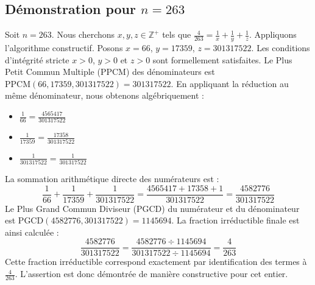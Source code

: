 \documentclass[11pt,a4paper]{article}
\begin{document}
\subsection{Démonstration pour $n = 263$}
Soit $n = 263$. Nous cherchons $x, y, z \in \mathbb{Z}^{+}$ tels que $\frac{4}{263} = \frac{1}{x} + \frac{1}{y} + \frac{1}{z}$.
Appliquons l'algorithme constructif. Posons $x = 66$, $y = 17359$, $z = 301317522$.
Les conditions d'intégrité stricte $x > 0$, $y > 0$ et $z > 0$ sont formellement satisfaites.
Le Plus Petit Commun Multiple (PPCM) des dénominateurs est $\text{PPCM}(66, 17359, 301317522) = 301317522$.
En appliquant la réduction au même dénominateur, nous obtenons algébriquement :
\begin{itemize}
    \item $\frac{1}{66} = \frac{4565417}{301317522}$
    \item $\frac{1}{17359} = \frac{17358}{301317522}$
    \item $\frac{1}{301317522} = \frac{1}{301317522}$
\end{itemize}
La sommation arithmétique directe des numérateurs est :
$$ \frac{1}{66} + \frac{1}{17359} + \frac{1}{301317522} = \frac{4565417 + 17358 + 1}{301317522} = \frac{4582776}{301317522} $$
Le Plus Grand Commun Diviseur (PGCD) du numérateur et du dénominateur est $\text{PGCD}(4582776, 301317522) = 1145694$.
La fraction irréductible finale est ainsi calculée :
$$ \frac{4582776}{301317522} = \frac{4582776 \div 1145694}{301317522 \div 1145694} = \frac{4}{263} $$
Cette fraction irréductible correspond exactement par identification des termes à $\frac{4}{263}$. L'assertion est donc démontrée de manière constructive pour cet entier.
\end{document}
